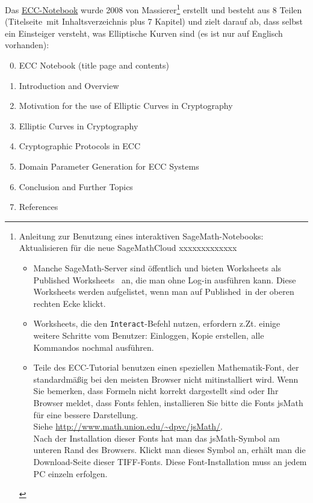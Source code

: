 \begin{refsegment}
Das \hyperlink{ec:Web-Link:Sage_Massierer}{ECC-Notebook}
wurde 2008 von Massierer\footnote{%
Anleitung zur Benutzung eines interaktiven SageMath-Notebooks:
Aktualisieren für die neue SageMathCloud xxxxxxxxxxxxx\\
\begin{itemize}[nosep,label=-]
  \item Manche SageMath-Server sind öffentlich
  und bieten Worksheets als
  \glqq Published Worksheets\grqq~ an, die man ohne Log-in
  ausführen kann. Diese Worksheets werden aufgelistet, wenn man
  auf \glqq Published\grqq~in der oberen rechten Ecke klickt.
  \item Worksheets, die den  \verb#Interact#-Befehl nutzen, erfordern z.Zt.
  einige weitere Schritte vom Benutzer: Einloggen, Kopie erstellen,
  alle Kommandos nochmal ausführen.\\
\item
  Teile des ECC-Tutorial benutzen einen speziellen Mathematik-Font, der standardmäßig
  bei den meisten Browser nicht mitinstalliert wird. Wenn Sie bemerken, dass Formeln
  nicht korrekt dargestellt sind oder Ihr Browser meldet, dass Fonts fehlen,
  installieren Sie bitte die Fonts jsMath für eine bessere Darstellung.\\
  Siehe \url{http://www.math.union.edu/~dpvc/jsMath/}.\\
  Nach der Installation dieser Fonts hat man das jsMath-Symbol am unteren Rand
  des Browsers. Klickt man dieses Symbol an, erhält man die Download-Seite dieser
  TIFF-Fonts. Diese Font-Installation muss an jedem PC einzeln erfolgen.
\end{itemize}
}
erstellt und besteht aus 8 Teilen (\glqq Titelseite\grqq~mit Inhaltsverzeichnis
plus 7 Kapitel) und zielt darauf ab, dass selbst ein Einsteiger versteht, was
Elliptische Kurven sind (es ist nur auf Englisch vorhanden):
\begin{enumerate}
   \setcounter{enumi}{-1}
   \item ECC Notebook (title page and contents)
   \item Introduction and Overview
   \item Motivation for the use of Elliptic Curves in Cryptography
   \item Elliptic Curves in Cryptography
   \item Cryptographic Protocols in ECC
   \item Domain Parameter Generation for ECC Systems
   \item Conclusion and Further Topics
   \item References
\end{enumerate}



\end{refsegment}
